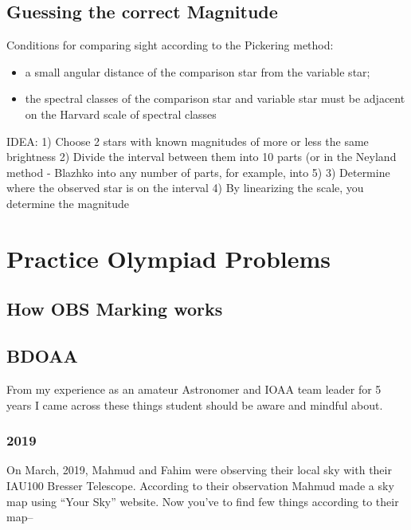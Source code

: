 \documentclass[a4paper,12pt]{extarticle}
\begin{document}
\subsection{Guessing the correct Magnitude}

Conditions for comparing sight according to the Pickering method:
\begin{itemize}
	\itemsep0em
	\item a small angular distance of the comparison star from the variable star;
	\item the spectral classes of the comparison star and variable star must be adjacent on the Harvard scale of spectral classes
\end{itemize}

IDEA:
1) Choose 2 stars with known magnitudes of more or less the same brightness
2) Divide the interval between them into 10 parts (or in the Neyland method - Blazhko into any number of parts, for example, into 5)
3) Determine where the observed star is on the interval
4) By linearizing the scale, you determine the magnitude

\section{Practice Olympiad Problems}


\subsection{How OBS Marking works}




\clearpage
\subsection{BDOAA}
From my experience as an amateur Astronomer and IOAA team leader for 5 years I came across these things student should be aware and mindful about. 
\subsubsection{2019}
On  March, 2019, Mahmud and Fahim were observing their local sky with their IAU100 Bresser Telescope. According to their observation Mahmud made a sky map using “Your Sky” website. Now you’ve to find few things according to their map--
\end{document}
